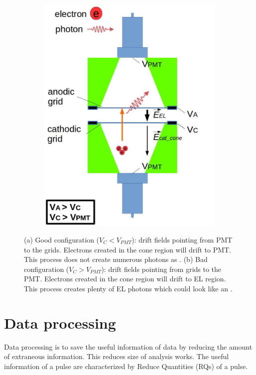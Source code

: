 \begin{figure}[!p]
\begin{subfigure}[b]{\halfwidth}
   \includegraphics[width=\figurewidth,clip,trim={0 0 0 0}]{Figures/GasTest/WeiDrawEvent/BadConfig.jpg}
   \caption{}
   \label{fig:BelowCathodeIllustration:BadConfig}
 \end{subfigure}
 \caption[\gtest\ good and bad voltage configurations.]{(a) Good configuration ($V_{C} < V_{PMT}$): drift fields pointing from PMT to the grids. Electrons created in the cone region will drift to PMT. This process does not create numerous photons as \ees . (b) Bad configuration  ($V_{C} > V_{PMT}$): drift fields pointing from grids to the PMT. Electrons created in the cone region will drift to EL region. This process creates plenty of EL photons which could look like an \ees .}
 \label{fig:BelowCathodeIllustration}
\end{figure}

\section{Data processing} %
\label{sec:gtest data process}
Data processing is to save the useful information of data by reducing the amount of extraneous information. This reduces size of analysis works. The useful information of a pulse are characterized by Reduce Quantities (RQs) of a pulse.

